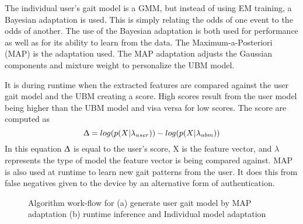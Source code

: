 \documentclass{sig-alternate}
\begin{document}
	The individual user's gait model is a GMM, but instead of using EM training, a Bayesian adaptation is used. This is simply relating the odds of one event to the odds of another. The use of the Bayesian adaptation is both used for performance as well as for its ability to learn from the data. The Maximum-a-Posteriori (MAP) is the adaptation used. The MAP adaptation adjusts the Gaussian components and mixture weight to personalize the UBM model. 
	
	It is during runtime when the extracted features are compared against the user gait model and the UBM creating a score. High scores result from the user model being higher than the UBM model and visa versa for low scores. The score are computed as \begin{equation}
	\Updelta = log(p(X|\lambda_{user})) - log(p(X|\lambda_{ubm}))
	\end{equation}
In this equation \begin{math} \Updelta \end{math} is equal to the user's score, X is the feature vector, and \begin{math} \lambda \end{math} represents the type of model the feature vector is being compared against. MAP is also used at runtime to learn new gait patterns from the user. It does this from false negatives given to the device by an alternative form of authentication. 

\begin{figure}
\centering
{}
\caption{Algorithm work-flow for (a) generate user gait model by MAP adaptation (b) runtime inference and Individual model adaptation}
\label{fig:TD2}
\end{figure}

\end{document}
